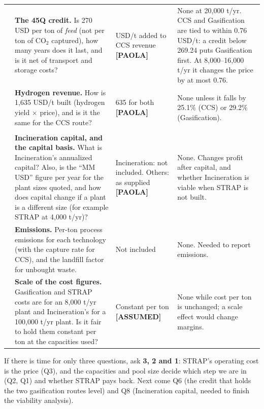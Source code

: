 \documentclass[11pt]{article}
\newcommand{\PAOLA}{\textcolor{paolacolor}{\textbf{[PAOLA]}}}
\newcommand{\ASSUMED}{\textcolor{assumedcolor}{\textbf{[ASSUMED]}}}
\newcommand{\usd}{USD}
\begin{document}
{\begin{longtable}{@{}>{\raggedright\arraybackslash}p{0.5cm}>{\raggedright\arraybackslash}p{6.2cm}>{\raggedright\arraybackslash}p{3.3cm}>{\raggedright\arraybackslash}p{4.6cm}@{}}
6 & \textbf{The 45Q credit.} Is 270 \usd{} per ton of \emph{feed} (not per ton of CO$_2$ captured), how many years does it last, and is it net of transport and storage costs? & 270 \usd/t added to CCS revenue \PAOLA & None at 20{,}000 t/yr. CCS and Gasification are tied to within 0.76 \usd/t: a credit below 269.24 puts Gasification first. At 8{,}000--16{,}000 t/yr it changes the price by at most 0.76. \\
7 & \textbf{Hydrogen revenue.} How is 1{,}635 \usd/t built (hydrogen yield $\times$ price), and is it the same for the CCS route? & 1{,}635 for both \PAOLA & None unless it falls by 25.1\% (CCS) or 29.2\% (Gasification). \\[0.4em]
\midrule
\multicolumn{4}{@{}l}{\textbf{Do not change $\lambda$, but are needed for a full analysis}}\\*[0.2em]
8 & \textbf{Incineration capital, and the capital basis.} What is Incineration's annualized capital? Also, is the ``MM USD'' figure per year for the plant sizes quoted, and how does capital change if a plant is a different size (for example STRAP at 4{,}000 t/yr)? & Incineration: not included. Others: as supplied \PAOLA & None. Changes profit after capital, and whether Incineration is viable when STRAP is not built. \\
9 & \textbf{Emissions.} Per-ton process emissions for each technology (with the capture rate for CCS), and the landfill factor for unbought waste. & Not included & None. Needed to report emissions. \\
10 & \textbf{Scale of the cost figures.} Gasification and STRAP costs are for an 8{,}000 t/yr plant and Incineration's for a 100{,}000 t/yr plant. Is it fair to hold them constant per ton at the capacities used? & Constant per ton \ASSUMED & None while cost per ton is unchanged; a scale effect would change margins. \\
\bottomrule
\end{longtable}
}

\begin{readbox}
If there is time for only three questions, ask \textbf{3, 2 and 1}: STRAP's operating
cost is the price (Q3), and the capacities and pool size decide which step we are in
(Q2, Q1) and whether STRAP pays back. Next come Q6 (the credit that holds the two
gasification routes level) and Q8 (Incineration capital, needed to finish the
viability analysis).
\end{readbox}

\appendix
\end{document}
